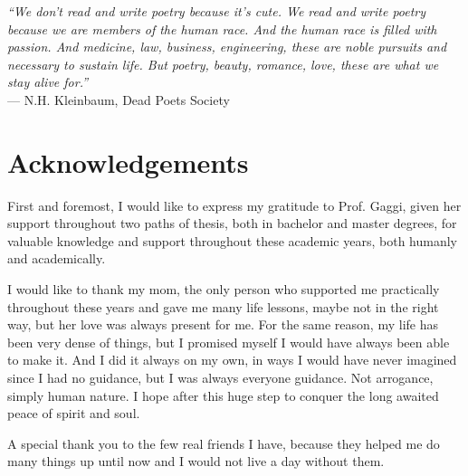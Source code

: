 \cleardoublepage
{}
{}

\begin{flushright}{
    \slshape
    ``We don't read and write poetry because it's cute. We read and write poetry because we are members of the human race. And the human race is filled with passion. And medicine, law, business, engineering, these are noble pursuits and necessary to sustain life. But poetry, beauty, romance, love, these are what we stay alive for.''} \\
    \medskip
    --- N.H. Kleinbaum, Dead Poets Society
\end{flushright}

\begingroup
\let\clearpage\relax
\let\cleardoublepage\relax
\let\cleardoublepage\relax

\chapter*{Acknowledgements}

\noindent First and foremost, I would like to express my gratitude to Prof. Gaggi, given her support throughout two paths of thesis, both in bachelor and master degrees, for valuable knowledge and support throughout these academic years, both humanly and academically. 

\vspace{0.35cm}

\noindent I would like to thank my mom, the only person who supported me practically throughout these years and gave me many life lessons, maybe not in the right way, but her love was always present for me. For the same reason, my life has been very dense of things, but I promised myself I would have always been able to make it. And I did it always on my own, in ways I would have never imagined since I had no guidance, but I was always everyone guidance. Not arrogance, simply human nature. I hope after this huge step to conquer the long awaited peace of spirit and soul. 

\vspace{0.35cm}

\noindent A special thank you to the few real friends I have, because they helped me do many things up until now and I would not live a day without them.

\vspace{0.75cm}

\noindent{\myLocation, \myTime}
\hfill \textit{\myName}

\endgroup
